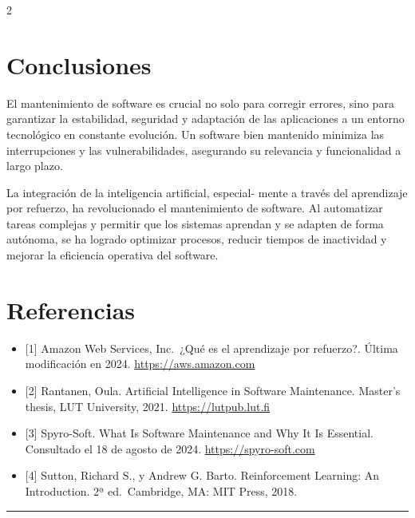 \documentclass[12pt,spanish,Letterpaper,openany]{book}
\newcommand{\HRule}{\begin{center}\rule{0.5\linewidth}{0.2mm}\end{center}}
\begin{document}
\begin {multicols}{2}
\hypertarget{conclusiones-9}{%
\section{Conclusiones}\label{conclusiones-9}}

El mantenimiento de software es crucial no solo para corregir errores, sino para garantizar la estabilidad, seguridad y adaptación de las aplicaciones a un entorno tecnológico en constante evolución. Un software bien mantenido minimiza las interrupciones y las vulnerabilidades, asegurando su relevancia y funcionalidad a largo plazo.

La integración de la inteligencia artificial, especial-
mente a través del aprendizaje por refuerzo, ha revolucionado el mantenimiento de software. Al automatizar tareas complejas y permitir que los sistemas aprendan y se adapten de forma autónoma, se ha logrado optimizar procesos, reducir tiempos de inactividad y mejorar la eficiencia operativa del software.

\hypertarget{referencias-8}{%
\section{Referencias}\label{referencias-8}}

\begin{itemize}
\item
  {[}1{]} Amazon Web Services, Inc.~¿Qué es el aprendizaje por refuerzo?. Última modificación en 2024.
  \href{https://aws.amazon.com/es/what-is/reinforcement-learning/}{https://aws.amazon.com}
\item
  {[}2{]} Rantanen, Oula. Artificial Intelligence in Software Maintenance. Master's thesis, LUT University, 2021. \href{https://lutpub.lut.fi/handle/10024/163419}{https://lutpub.lut.fi}
\item
  {[}3{]} Spyro-Soft. What Is Software Maintenance and Why It Is Essential. Consultado el 18 de agosto de 2024. \href{https://spyro-soft.com/blog/managed-services/what-is-software-maintenance-and-why-it-is-essential}{https://spyro-soft.com}
\item
  {[}4{]} Sutton, Richard S., y Andrew G. Barto. Reinforcement Learning: An Introduction. 2ª ed.~Cambridge, MA: MIT Press, 2018.
\end{itemize}

\end {multicols}

\medskip

\HRule
\end{document}
